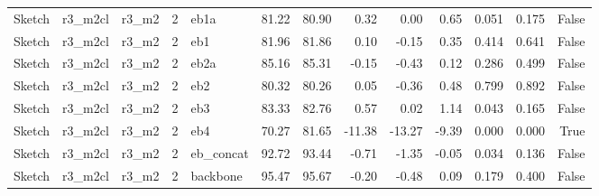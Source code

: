 \begin{table}
\begin{tabular}{lllrlrrrrrllr}
Sketch & r3\_m2cl & r3\_m2 & 2 & eb1a & 81.22 & 80.90 & 0.32 & 0.00 & 0.65 & 0.051 & 0.175 & False \\
Sketch & r3\_m2cl & r3\_m2 & 2 & eb1 & 81.96 & 81.86 & 0.10 & -0.15 & 0.35 & 0.414 & 0.641 & False \\
Sketch & r3\_m2cl & r3\_m2 & 2 & eb2a & 85.16 & 85.31 & -0.15 & -0.43 & 0.12 & 0.286 & 0.499 & False \\
Sketch & r3\_m2cl & r3\_m2 & 2 & eb2 & 80.32 & 80.26 & 0.05 & -0.36 & 0.48 & 0.799 & 0.892 & False \\
Sketch & r3\_m2cl & r3\_m2 & 2 & eb3 & 83.33 & 82.76 & 0.57 & 0.02 & 1.14 & 0.043 & 0.165 & False \\
Sketch & r3\_m2cl & r3\_m2 & 2 & eb4 & 70.27 & 81.65 & -11.38 & -13.27 & -9.39 & 0.000 & 0.000 & True \\
Sketch & r3\_m2cl & r3\_m2 & 2 & eb\_concat & 92.72 & 93.44 & -0.71 & -1.35 & -0.05 & 0.034 & 0.136 & False \\
Sketch & r3\_m2cl & r3\_m2 & 2 & backbone & 95.47 & 95.67 & -0.20 & -0.48 & 0.09 & 0.179 & 0.400 & False \\
\bottomrule
\end{tabular}
\end{table}
